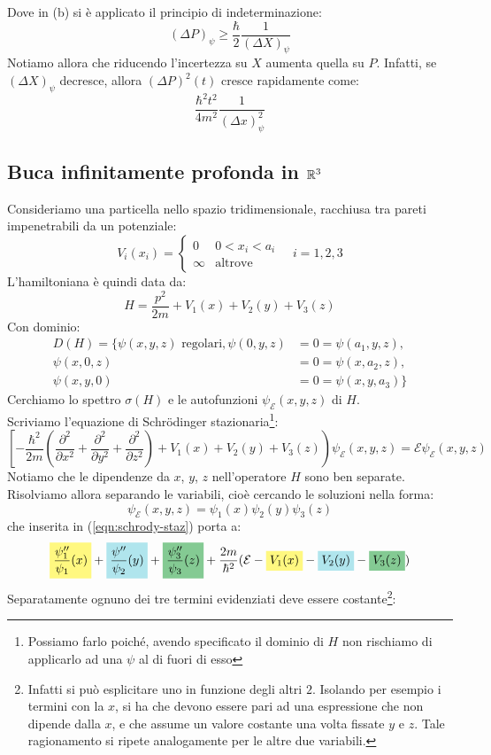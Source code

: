 \documentclass[../../FisicaTeorica.tex]{subfiles}
\begin{document}
Dove in (b) si è applicato il principio di indeterminazione: 
\[
(\Delta P)_\psi \geq \frac{\hbar}{2}\frac{1}{(\Delta X)_\psi}
\]
Notiamo allora che riducendo l'incertezza su $X$ aumenta quella su $P$. Infatti, se $(\Delta X)_\psi$ decresce, allora $(\Delta P)^2(t)$ cresce rapidamente come:
\[
\frac{\hbar^2 t^2}{4m^2}\frac{1}{(\Delta x)^2_\psi}
\]

\subsection{Buca infinitamente profonda in $\mathbb{R}^3$}
Consideriamo una particella nello spazio tridimensionale, racchiusa tra pareti impenetrabili da un potenziale:
\[
V_i(x_i)=\begin{cases}
0 & 0 < x_i < a_i\\
\infty & \text{altrove}
\end{cases}
\quad i=1,2,3
\]
L'hamiltoniana è quindi data da:
\[
H=\frac{p^2}{2m}+V_1(x)+V_2(y)+V_3(z)
\]
Con dominio:
\begin{align*}
D(H)=\{
\psi(x,y,z) \text{ regolari}, 
\psi(0,y,z)&=0=\psi(a_1,y,z),\\
\psi(x,0,z)&=0=\psi(x,a_2,z),\\
\psi(x,y,0)&=0=\psi(x,y,a_3)
\}
\end{align*}
Cerchiamo lo spettro $\sigma(H)$ e le autofunzioni $\psi_{\mathcal{E}}(x,y,z)$ di $H$.\\
Scriviamo l'equazione di Schrödinger stazionaria\footnote{Possiamo farlo poiché, avendo specificato il dominio di $H$ non rischiamo di applicarlo ad una $\psi$ al di fuori di esso}:
\begin{equation}
\left[
-\frac{\hbar^2}{2m}\left(\frac{\partial^2}{\partial x^2}+\frac{\partial^2}{\partial y^2}+\frac{\partial^2}{\partial z^2}\right )+V_1(x)+V_2(y)+V_3(z)\right)\psi_{\mathcal{E}}(x,y,z)
=\mathcal{E}\psi_{\mathcal{E}}(x,y,z)
\label{eqn:schrody-staz}
\end{equation}
Notiamo che le dipendenze da $x$, $y$, $z$ nell'operatore $H$ sono ben separate. Risolviamo allora separando le variabili, cioè cercando le soluzioni nella forma:
\[
\psi_{\mathcal{E}}(x,y,z)=\psi_1(x)\psi_2(y)\psi_3(z)
\]
che inserita in (\ref{eqn:schrody-staz}) porta a: %
\[
\hlc{Yellow}{\frac{\psi_1''}{\psi_1}(x)}+\hlc{SkyBlue}{\frac{\psi''}{\psi_2}(y)}+\hlc{ForestGreen}{\frac{\psi_3''}{\psi_3}(z)} + \frac{2m}{\hbar^2}(\mathcal{E} -\hlc{Yellow}{V_1(x)}-\hlc{SkyBlue}{V_2(y)}-\hlc{ForestGreen}{V_3(z)})
\]
Separatamente ognuno dei tre termini evidenziati deve essere costante\footnote{Infatti si può esplicitare uno in funzione degli altri $2$. Isolando per esempio i termini con la $x$, si ha che devono essere pari ad una espressione che non dipende dalla $x$, e che assume un valore costante una volta fissate $y$ e $z$. Tale ragionamento si ripete analogamente per le altre due variabili.}:
\end{document}
